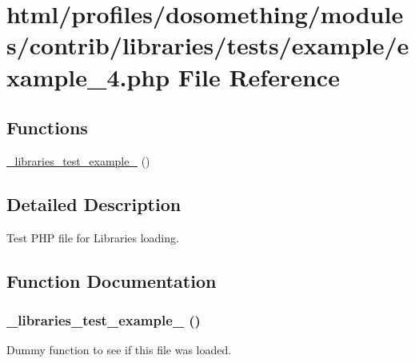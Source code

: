 \hypertarget{example__4_8php}{
\section{html/profiles/dosomething/modules/contrib/libraries/tests/example/example\_\-4.php File Reference}
\label{example__4_8php}
}
\subsection*{Functions}
\begin{DoxyCompactItemize}
\item 
\hyperlink{example__4_8php_a472c10aa70f58dec5be94f635ec626e6}{\_\-libraries\_\-test\_\-example\_} ()
\end{DoxyCompactItemize}


\subsection{Detailed Description}
Test PHP file for Libraries loading. 

\subsection{Function Documentation}
\hypertarget{example__4_8php_a472c10aa70f58dec5be94f635ec626e6}{
\subsubsection[{\_\-libraries\_\-test\_\-example\_\-4}]{\setlength{\rightskip}{0pt plus 5cm}\_\-libraries\_\-test\_\-example\_ ()}}
\label{example__4_8php_a472c10aa70f58dec5be94f635ec626e6}
Dummy function to see if this file was loaded. 